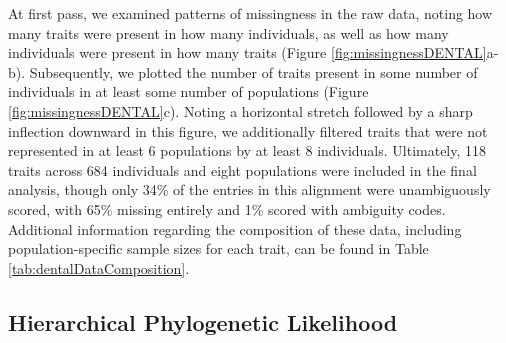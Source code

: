 \documentclass[10pt, twocolumn, twoside]{article}
\begin{document}
At first pass, we examined patterns of missingness in the raw data, noting how many traits were present in how many individuals, as well as how many individuals were present in how many traits (Figure \ref{fig:missingnessDENTAL}a-b). Subsequently, we plotted the number of traits present in some number of individuals in at least some number of populations (Figure \ref{fig:missingnessDENTAL}c). Noting a horizontal stretch followed by a sharp inflection downward in this figure, we additionally filtered traits that were not represented in at least 6 populations by at least 8 individuals. Ultimately, 118 traits across 684 individuals and eight populations were included in the final analysis, though only 34\% of the entries in this alignment were unambiguously scored, with 65\% missing entirely and 1\% scored with ambiguity codes. Additional information regarding the composition of these data, including population-specific sample sizes for each trait, can be found in Table \ref{tab:dentalDataComposition}.

\subsection{Hierarchical Phylogenetic Likelihood}
\end{document}
